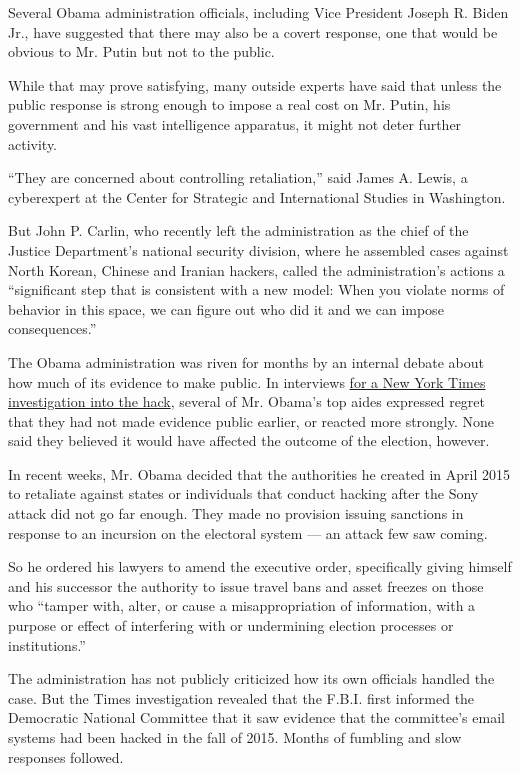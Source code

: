 Several Obama administration officials, including Vice President Joseph
R. Biden Jr., have suggested that there may also be a covert response,
one that would be obvious to Mr. Putin but not to the public.

While that may prove satisfying, many outside experts have said that
unless the public response is strong enough to impose a real cost on Mr.
Putin, his government and his vast intelligence apparatus, it might not
deter further activity.

``They are concerned about controlling retaliation,'' said James A.
Lewis, a cyberexpert at the Center for Strategic and International
Studies in Washington.

But John P. Carlin, who recently left the administration as the chief of
the Justice Department's national security division, where he assembled
cases against North Korean, Chinese and Iranian hackers, called the
administration's actions a ``significant step that is consistent with a
new model: When you violate norms of behavior in this space, we can
figure out who did it and we can impose consequences.''

The Obama administration was riven for months by an internal debate
about how much of its evidence to make public. In interviews
\href{https://www.nytimes.com/2016/12/13/us/politics/russia-hack-election-dnc.html?hp\&action=click\&pgtype=Homepage\&clickSource=story-heading\&module=b-lede-package-region\&region=top-news\&WT.nav=top-news\&_r=0,}{for
a New York Times investigation into the hack}, several of Mr. Obama's
top aides expressed regret that they had not made evidence public
earlier, or reacted more strongly. None said they believed it would have
affected the outcome of the election, however.

In recent weeks, Mr. Obama decided that the authorities he created in
April 2015 to retaliate against states or individuals that conduct
hacking after the Sony attack did not go far enough. They made no
provision issuing sanctions in response to an incursion on the electoral
system --- an attack few saw coming.

So he ordered his lawyers to amend the executive order, specifically
giving himself and his successor the authority to issue travel bans and
asset freezes on those who ``tamper with, alter, or cause a
misappropriation of information, with a purpose or effect of interfering
with or undermining election processes or institutions.''

The administration has not publicly criticized how its own officials
handled the case. But the Times investigation revealed that the F.B.I.
first informed the Democratic National Committee that it saw evidence
that the committee's email systems had been hacked in the fall of 2015.
Months of fumbling and slow responses followed.

